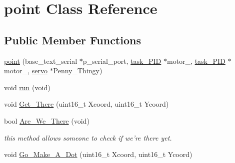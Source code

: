 \hypertarget{classpoint}{\section{point Class Reference}
\label{classpoint}
}
\subsection*{Public Member Functions}
\begin{DoxyCompactItemize}
\item 
\hyperlink{classpoint_a74f05b63149c2931870fdb68a10c6ba9}{point} (base\-\_\-text\-\_\-serial $\ast$p\-\_\-serial\-\_\-port, \hyperlink{classtask__PID}{task\-\_\-\-P\-I\-D} $\ast$motor\-\_, \hyperlink{classtask__PID}{task\-\_\-\-P\-I\-D} $\ast$motor\-\_, \hyperlink{classservo}{servo} $\ast$Penny\-\_\-\-Thingy)
\item 
void \hyperlink{classpoint_ab52a800806170858caf2ad323e2dce55}{run} (void)
\item 
void \hyperlink{classpoint_a5ced7e6ba6d4ee79d48bd762ac5f3fee}{Get\-\_\-\-There} (uint16\-\_\-t Xcoord, uint16\-\_\-t Ycoord)
\item 
\hypertarget{classpoint_a12d2d37f3c39c4ffdb51f1d38e3d933e}{bool \hyperlink{classpoint_a12d2d37f3c39c4ffdb51f1d38e3d933e}{Are\-\_\-\-We\-\_\-\-There} (void)}\label{classpoint_a12d2d37f3c39c4ffdb51f1d38e3d933e}

\begin{DoxyCompactList}\small\item\em this method allows someone to check if we're there yet. \end{DoxyCompactList}\item 
void \hyperlink{classpoint_a67895bcb2b18dd568041f66c201a5943}{Go\-\_\-\-Make\-\_\-\-A\-\_\-\-Dot} (uint16\-\_\-t Xcoord, uint16\-\_\-t Ycoord)
\end{DoxyCompactItemize}
